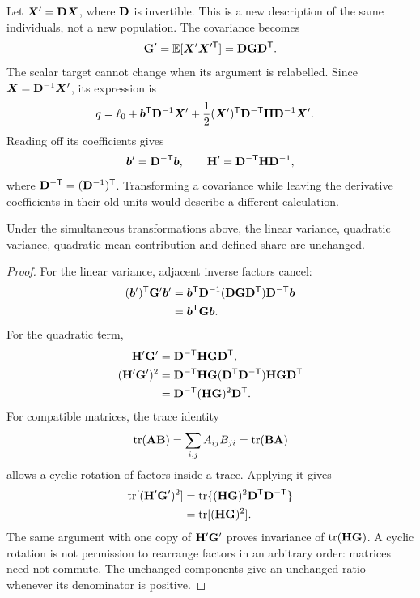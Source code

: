 Let $\boldsymbol{X}'=\mathbf{D}\boldsymbol{X}$, where $\mathbf{D}$ is invertible. This is a
new description of the same individuals, not a new population. The
covariance becomes
\begin{equation}
\mathbf{G}'=\mathbb E[\boldsymbol{X}'\boldsymbol{X}'^{\mathsf T}]
       =\mathbf{D}\mathbf{G}\mathbf{D}^{\mathsf T}.
\end{equation}
The scalar target cannot change when its argument is relabelled. Since
$\boldsymbol{X}=\mathbf{D}^{-1}\boldsymbol{X}'$, its expression is
\begin{align}
q&=\ell_0+\boldsymbol{b}^{\mathsf T}\mathbf{D}^{-1}\boldsymbol{X}'
 +\frac12(\boldsymbol{X}')^{\mathsf T}
           \mathbf{D}^{-\mathsf T}\mathbf{H}\mathbf{D}^{-1}\boldsymbol{X}'.
\end{align}
Reading off its coefficients gives
\begin{equation}
\boldsymbol{b}'=\mathbf{D}^{-\mathsf T}\boldsymbol{b},
\qquad
\mathbf{H}'=\mathbf{D}^{-\mathsf T}\mathbf{H}\mathbf{D}^{-1},
\label{geometry:transformation_rules}
\end{equation}
where $\mathbf{D}^{-\mathsf T}=(\mathbf{D}^{-1})^{\mathsf T}$.
Transforming a covariance while leaving the derivative coefficients in
their old units would describe a different calculation.

\begin{proposition}
\label{geometry:coordinate_invariance}
Under the simultaneous transformations above, the linear variance,
quadratic variance, quadratic mean contribution and defined share are
unchanged.
\end{proposition}
\begin{proof}
For the linear variance, adjacent inverse factors cancel:
\begin{align}
(\boldsymbol{b}')^{\mathsf T}\mathbf{G}'\boldsymbol{b}'
 &=\boldsymbol{b}^{\mathsf T}\mathbf{D}^{-1}
     (\mathbf{D}\mathbf{G}\mathbf{D}^{\mathsf T})
       \mathbf{D}^{-\mathsf T}\boldsymbol{b}\nonumber\\
 &=\boldsymbol{b}^{\mathsf T}\mathbf{G}\boldsymbol{b}.
\end{align}
For the quadratic term,
\begin{align}
\mathbf{H}'\mathbf{G}'
 &=\mathbf{D}^{-\mathsf T}\mathbf{H}\mathbf{G}\mathbf{D}^{\mathsf T},\nonumber\\
(\mathbf{H}'\mathbf{G}')^2
 &=\mathbf{D}^{-\mathsf T}\mathbf{H}\mathbf{G}
    (\mathbf{D}^{\mathsf T}\mathbf{D}^{-\mathsf T})
    \mathbf{H}\mathbf{G}\mathbf{D}^{\mathsf T}\nonumber\\
 &=\mathbf{D}^{-\mathsf T}(\mathbf{H}\mathbf{G})^2\mathbf{D}^{\mathsf T}.
\end{align}
For compatible matrices, the trace identity
\[
\operatorname{tr}(\mathbf{A}\mathbf{B})=\sum_{i,j}A_{ij}B_{ji}
                 =\operatorname{tr}(\mathbf{B}\mathbf{A})
\]
allows a cyclic rotation of factors inside a trace. Applying it gives
\begin{align}
\operatorname{tr}[(\mathbf{H}'\mathbf{G}')^2]
 &=\operatorname{tr}\{(\mathbf{H}\mathbf{G})^2
          \mathbf{D}^{\mathsf T}\mathbf{D}^{-\mathsf T}\}\nonumber\\
 &=\operatorname{tr}[(\mathbf{H}\mathbf{G})^2].
\end{align}
The same argument with one copy of $\mathbf{H}'\mathbf{G}'$ proves invariance
of $\operatorname{tr}(\mathbf{H}\mathbf{G})$. A cyclic rotation is not permission to rearrange
factors in an arbitrary order: matrices need not commute. The unchanged
components give an unchanged ratio whenever its denominator is positive.
\end{proof}

